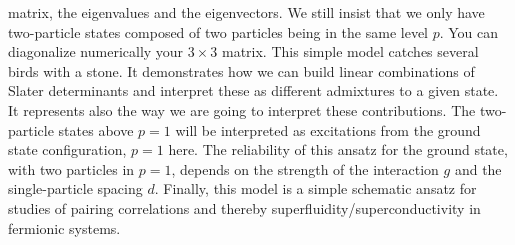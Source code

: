 \documentclass[prc]{revtex4}
\begin{document}
\begin{enumerate}
matrix, the eigenvalues and the eigenvectors. We still insist that we only have two-particle states composed of two particles being in the same
level $p$. You can diagonalize numerically your $3\times 3$ matrix.\newline\newline
This simple model catches several birds with a stone. It demonstrates how we can build linear combinations
of Slater determinants and interpret these as different admixtures to a given state. It represents also the way we are going to interpret these contributions.  The two-particle states above $p=1$ will be interpreted as 
excitations from the ground state configuration, $p=1$ here.  The reliability of this ansatz for the ground state, 
with two particles in $p=1$,
depends on the strength of the interaction $g$ and the single-particle spacing $d$.
Finally, this model is a simple schematic ansatz for studies of pairing correlations and thereby superfluidity/superconductivity  
in fermionic systems. 
\end{enumerate}
\end{document}
